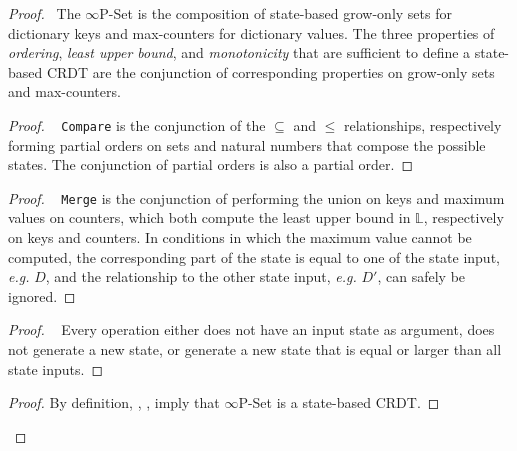 \documentclass[9pt, oneside]{article}   	%
\begin{document}
\begin{proof}
	\pfsketch ~The $\infty$P-Set is the composition of state-based grow-only sets for dictionary keys and max-counters for dictionary values. The three properties of \textit{ordering}, \textit{least upper bound}, and \textit{monotonicity} that are sufficient to define a state-based CRDT are the conjunction of corresponding properties on grow-only sets and max-counters.
	
	\label{proof:state-crdt}
	\begin{proof}
		\pfsketch~ \texttt{Compare} is the conjunction of the $\subseteq$ and $\leq$ relationships, respectively forming partial orders on sets and natural numbers that compose the possible states. The conjunction of partial orders is also a partial order.		
	\end{proof}

	\begin{proof}
			\pfsketch~ \texttt{Merge} is the conjunction of performing the union on keys and maximum values on counters, which both compute the least upper bound in $\mathds{L}$, respectively on keys and counters. In conditions in which the maximum value cannot be computed, the corresponding part of the state is equal to one of the state input, \textit{e.g.} $D$, and the relationship to the other state input, \textit{e.g.} $D'$, can safely be ignored.
	\end{proof}

	
	\begin{proof}
		\pfsketch~ Every operation either does not have an input state as argument, does not generate a new state, or generate a new state that is equal or larger than all state inputs.
	\end{proof}

	\qedstep
	\begin{proof}
		\pf By definition, , ,  imply that $\infty$P-Set is a state-based CRDT. 
	\end{proof}
\end{proof}
\end{document}
